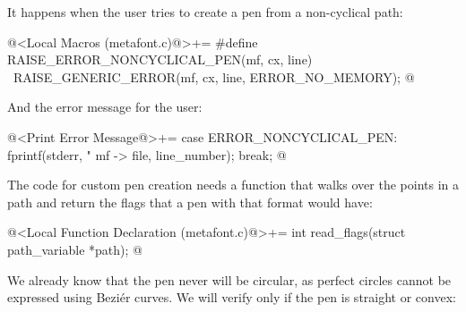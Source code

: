 {{{{{It happens when the user tries to create a pen from a non-cyclical
path:

\iniciocodigo
@<Local Macros (metafont.c)@>+=
#define RAISE_ERROR_NONCYCLICAL_PEN(mf, cx, line) {\
  RAISE_GENERIC_ERROR(mf, cx, line, ERROR_NO_MEMORY);}
@
\fimcodigo

And the error message for the user:

\iniciocodigo
@<Print Error Message@>+=
case ERROR_NONCYCLICAL_PEN:
  fprintf(stderr, "%
          mf -> file, line_number);
  break;
@
\fimcodigo


The code for custom pen creation needs a function that walks over the
points in a path and return the flags that a pen with that format
would have:

\iniciocodigo
@<Local Function Declaration (metafont.c)@>+=
int read_flags(struct path_variable *path);
@
\fimcodigo

We already know that the pen never will be circular, as perfect
circles cannot be expressed using Beziér curves. We will verify only
if the pen is straight or convex:

}}}}}
